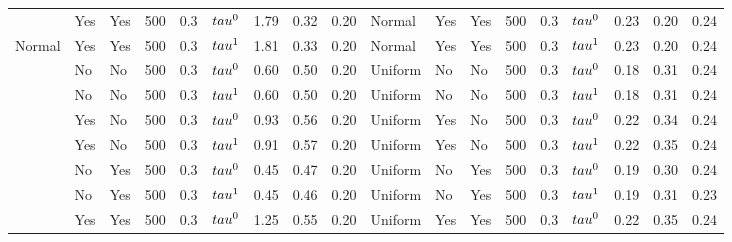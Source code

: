\begin{tabular}[t]{lllrrlrrrlllrrlrrr}
 & Yes & Yes & 500 & 0.3 & $\\tau^0$ & 1.79 & 0.32 & 0.20 & Normal & Yes & Yes & 500 & 0.3 & $\\tau^0$ & 0.23 & 0.20 & 0.24\\

\multirow{-8}{*}{\raggedright\arraybackslash Normal} & Yes & Yes & 500 & 0.3 & $\\tau^1$ & 1.81 & 0.33 & 0.20 & Normal & Yes & Yes & 500 & 0.3 & $\\tau^1$ & 0.23 & 0.20 & 0.24\\
\cmidrule{1-18}
 & No & No & 500 & 0.3 & $\\tau^0$ & 0.60 & 0.50 & 0.20 & Uniform & No & No & 500 & 0.3 & $\\tau^0$ & 0.18 & 0.31 & 0.24\\

 & No & No & 500 & 0.3 & $\\tau^1$ & 0.60 & 0.50 & 0.20 & Uniform & No & No & 500 & 0.3 & $\\tau^1$ & 0.18 & 0.31 & 0.24\\

 & Yes & No & 500 & 0.3 & $\\tau^0$ & 0.93 & 0.56 & 0.20 & Uniform & Yes & No & 500 & 0.3 & $\\tau^0$ & 0.22 & 0.34 & 0.24\\

 & Yes & No & 500 & 0.3 & $\\tau^1$ & 0.91 & 0.57 & 0.20 & Uniform & Yes & No & 500 & 0.3 & $\\tau^1$ & 0.22 & 0.35 & 0.24\\

 & No & Yes & 500 & 0.3 & $\\tau^0$ & 0.45 & 0.47 & 0.20 & Uniform & No & Yes & 500 & 0.3 & $\\tau^0$ & 0.19 & 0.30 & 0.24\\

 & No & Yes & 500 & 0.3 & $\\tau^1$ & 0.45 & 0.46 & 0.20 & Uniform & No & Yes & 500 & 0.3 & $\\tau^1$ & 0.19 & 0.31 & 0.23\\

 & Yes & Yes & 500 & 0.3 & $\\tau^0$ & 1.25 & 0.55 & 0.20 & Uniform & Yes & Yes & 500 & 0.3 & $\\tau^0$ & 0.22 & 0.35 & 0.24\\


\end{tabular}
